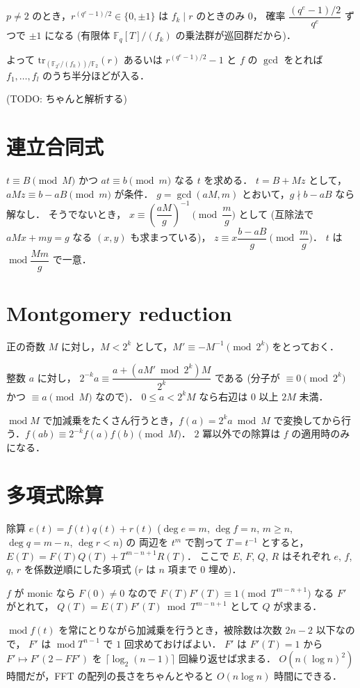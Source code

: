 \documentclass{jsarticle}
\DeclareMathOperator{\Mod}{mod}
\newcommand{\F}{\mathbb{F}}
\newcommand{\tr}{\mathrm{tr}}
\begin{document}
$p \ne 2$ のとき，$r^{(q^e - 1) / 2} \in \{ 0, \pm 1 \}$ は
$f_k \mid r$ のときのみ $0$，
確率 $\dfrac{(q^e - 1) / 2}{q^e}$ ずつで $\pm 1$ になる (有限体 $\F_q[T] / (f_k)$ の乗法群が巡回群だから)．

よって $\tr_{(\F_{2^e}/(f_k)) / \F_2}(r)$ あるいは $r^{(q^e - 1) / 2} - 1$ と $f$ の $\gcd$ をとれば
$f_1, \ldots, f_l$ のうち半分ほどが入る．

(TODO: ちゃんと解析する)


\section{連立合同式}
$t \equiv B \pmod{M}$ かつ $a t \equiv b \pmod{m}$ なる $t$ を求める．
$t = B + M z$ として，$a M z \equiv b - a B \pmod{m}$ が条件．
$g = \gcd(a M, m)$ とおいて，$g \nmid b - a B$ なら解なし．
そうでないとき，
$x \equiv \left( \dfrac{a M}{g} \right)^{-1} \pmod{\dfrac{m}{g}}$ として (互除法で $a M x + m y = g$ なる $(x, y)$ も求まっている)，
$z \equiv x \dfrac{b - a B}{g} \pmod{\dfrac{m}{g}}$．
$t$ は $\Mod \dfrac{M m}{g}$ で一意．


\section{Montgomery reduction}
正の奇数 $M$ に対し，$M < 2^k$ として，$M' \equiv -M^{-1} \pmod{2^k}$ をとっておく．

整数 $a$ に対し，
$2^{-k} a \equiv \dfrac{a + (a M' \bmod 2^k) M}{2^k}$ である (分子が $\equiv 0 \pmod{2^k}$ かつ $\equiv a \pmod{M}$ なので)．
$0 \le a < 2^k M$ なら右辺は $0$ 以上 $2 M$ 未満．

$\Mod M$ で加減乗をたくさん行うとき，$f(a) = 2^k a \bmod M$ で変換してから行う．$f(a b) \equiv 2^{-k} f(a) f(b) \pmod{M}$．
$2$ 冪以外での除算は $f$ の適用時のみになる．


\section{多項式除算}
除算 $e(t) = f(t) q(t) + r(t)$ ($\deg e = m$, $\deg f = n$, $m \ge n$, $\deg q = m - n$, $\deg r < n$) の
両辺を $t^m$ で割って $T = t^{-1}$ とすると，
$E(T) = F(T) Q(T) + T^{m-n+1} R(T)$．
ここで $E$, $F$, $Q$, $R$ はそれぞれ $e$, $f$, $q$, $r$ を係数逆順にした多項式 ($r$ は $n$ 項まで $0$ 埋め)．

$f$ が monic なら $F(0) \ne 0$ なので $F(T) F'(T) \equiv 1 \pmod{T^{m-n+1}}$ なる $F'$ がとれて，
$Q(T) = E(T) F'(T) \bmod T^{m-n+1}$ として $Q$ が求まる．

$\Mod f(t)$ を常にとりながら加減乗を行うとき，被除数は次数 $2 n - 2$ 以下なので，
$F'$ は $\Mod T^{n-1}$ で $1$ 回求めておけばよい．
$F'$ は $F'(T) = 1$ から $F' \mapsto F' (2 - F F')$ を $\lceil \log_2 (n - 1) \rceil$ 回繰り返せば求まる．
$O(n (\log n)^2)$ 時間だが，FFT の配列の長さをちゃんとやると $O(n \log n)$ 時間にできる．
\end{document}
